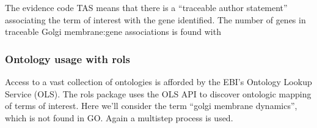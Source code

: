 \begin{shaded}
\begin{Highlighting}[]
\StringTok{ }\NormalTok{, }\NormalTok{,}
   \NormalTok{(}\NormalTok{, }\NormalTok{, }\NormalTok{))}
\end{Highlighting}
\end{shaded}

The evidence code TAS means that there is a ``traceable author statement''
associating the term of interest with the gene identified. The
number of genes in traceable Golgi membrane:gene associations
is found with

\begin{shaded}
\begin{Highlighting}[]
\OperatorTok{|}\ErrorTok{\textgreater{}}\StringTok{ }\OperatorTok{::}\OperatorTok{==}\NormalTok{) }\OperatorTok{|}\ErrorTok{\textgreater{}}\StringTok{ }\OperatorTok{|}\ErrorTok{\textgreater{}}\StringTok{ }\NormalTok{()}
\end{Highlighting}
\end{shaded}

\subsubsection{Ontology usage with rols}\label{ontology-usage-with-rols}

Access to a vast collection of ontologies is afforded by the EBI's
Ontology Lookup Service (OLS). The rols package uses the OLS API
to discover ontologic mapping of terms of interest. Here we'll
consider the term ``golgi membrane dynamics'', which is not found in GO.
Again a multistep process is used.

